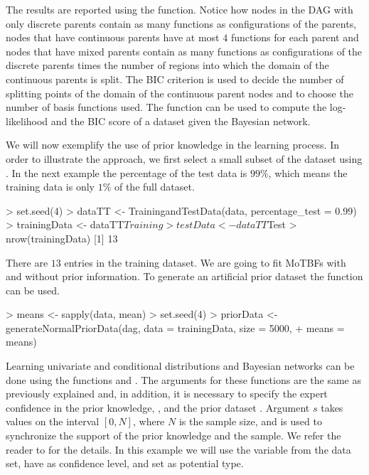 The results are reported using the  function. Notice how nodes in the DAG with only
discrete parents contain as many functions as configurations of the parents, nodes that have continuous parents have 
at most $4$ functions for each parent and nodes that have mixed parents contain as many functions as
configurations of the discrete parents times the number of regions into which the domain of the continuous
parents is split. The BIC criterion is used to decide the number of splitting points of the domain of the continuous parent 
nodes and to choose the number of basis functions used.
The function  can be used to compute the log-likelihood and the BIC score of a dataset
given the Bayesian network.

		
		
We will now exemplify the use of prior knowledge in the learning process.
In order to illustrate the approach, we first select a small subset of the  dataset using
. In the next example the percentage of the test data is $99\%$, which means the training data is only $1\%$ of the full dataset.
		
\begin{example}
> set.seed(4)
> dataTT <- TrainingandTestData(data, percentage_test = 0.99)
> trainingData <- dataTT$Training
> testData <- dataTT$Test
> nrow(trainingData)
[1] 13
\end{example}
		
		There are $13$ entries in the training dataset. We are going to fit MoTBFs with and without prior information.
		To generate an artificial prior dataset the  function can be used.
		
\begin{example}
> means <-  sapply(data, mean)
> set.seed(4)
> priorData <- generateNormalPriorData(dag, data = trainingData, size = 5000, 
+               means = means)
\end{example}
		
Learning univariate and conditional distributions and Bayesian networks can be done using the functions
 and . The arguments for these functions are 
the same as previously  explained and, in addition, it is necessary to specify the expert confidence in the prior 
knowledge, , and the prior dataset . Argument $s$ takes values on the interval $[0,N]$, 
where $N$ is the sample size, and is used to synchronize the support of the prior knowledge and the sample. 
We refer the reader to \citep{Per15} for the details. In this example we will use the  variable from the 
data set, have  as confidence level, and set  as potential type.
		
